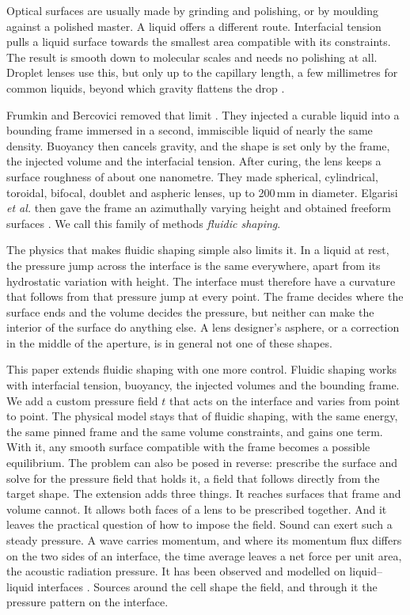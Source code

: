 \documentclass[11pt,a4paper]{article}
\numberwithin{equation}{section}
\begin{document}
Optical surfaces are usually made by grinding and polishing, or by moulding
against a polished master. A liquid offers a different route. Interfacial
tension pulls a liquid surface towards the smallest area compatible with its
constraints. The result is smooth down to molecular scales and needs no
polishing at all. Droplet lenses use this, but only up to the capillary
length, a few millimetres for common liquids, beyond which gravity flattens
the drop \cite{frumkin2021}.

Frumkin and Bercovici removed that limit \cite{frumkin2021}. They injected a
curable liquid into a bounding frame immersed in a second, immiscible liquid of
nearly the same density. Buoyancy then cancels gravity, and the shape is set
only by the frame, the injected volume and the interfacial tension. After
curing, the lens keeps a surface roughness of about one nanometre. They made
spherical, cylindrical, toroidal, bifocal, doublet and aspheric lenses, up to
200\,mm in diameter. Elgarisi \emph{et al.} then gave the frame an
azimuthally varying height and obtained freeform surfaces
\cite{elgarisi2021,elgarisi2021preprint}. We call this family of methods
\emph{fluidic shaping}.

The physics that makes fluidic shaping simple also limits it. In a liquid at
rest, the pressure jump across the interface is the same everywhere, apart from
its hydrostatic variation with height. The interface must therefore have a
curvature that follows from that pressure jump at every point. The frame
decides where the surface ends and the volume decides the pressure, but neither
can make the interior of the surface do anything else. A lens designer's
asphere, or a correction in the middle of the aperture, is in general not one
of these shapes.

This paper extends fluidic shaping with one more control. Fluidic shaping
works with interfacial tension, buoyancy, the injected volumes and the bounding
frame. We add a custom pressure field $t$ that acts on the interface and varies
from point to point. The physical model stays that of fluidic shaping, with the
same energy, the same pinned frame and the same volume constraints, and gains one
term. With it, any smooth surface compatible with the frame becomes a possible
equilibrium. The problem can also be posed in reverse: prescribe the surface
and solve for the pressure field that holds it, a field that follows directly
from the target shape. The extension adds three things. It reaches surfaces
that frame and volume cannot. It allows both faces of a lens to be prescribed
together. And it leaves the practical question of how to impose the field. Sound can exert such a steady pressure. A wave carries
momentum, and where its momentum flux differs on the two sides of an interface,
the time average leaves a net force per unit area, the acoustic radiation
pressure. It has been observed and modelled on liquid--liquid interfaces
\cite{issenmann2008,bertin2012,chesneau2022,sisombat2023}. Sources around the
cell shape the field, and through it the pressure pattern on the interface.
\end{document}
